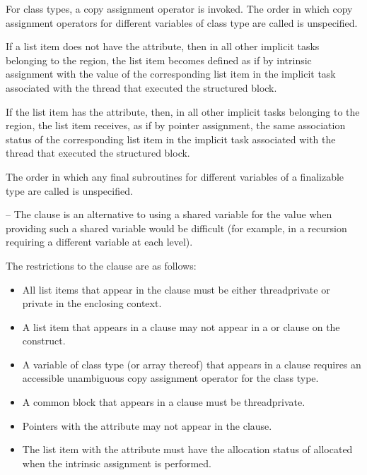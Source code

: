 {{{{\cppspecificstart
For class types, a copy assignment operator is invoked. The order in which copy 
assignment operators for different variables of class type are called is unspecified. 
\cppspecificend

\fortranspecificstart
If a list item does not have the  attribute, then in all other implicit tasks 
belonging to the  region, the list item becomes defined as if by intrinsic 
assignment with the value of the corresponding list item in the implicit task associated 
with the thread that executed the structured block. 

If the list item has the  attribute, then, in all other implicit tasks belonging to 
the  region, the list item receives, as if by pointer assignment, the same 
association status of the corresponding list item in the implicit task associated with the 
thread that executed the structured block.

The order in which any final subroutines for different variables of a finalizable type are called is unspecified.
\fortranspecificend

\notestart
\noteheader – The  clause is an alternative to using a shared variable for the 
value when providing such a shared variable would be difficult (for example, in a 
recursion requiring a different variable at each level). 
\noteend

\restrictions
The restrictions to the  clause are as follows:

\begin{itemize}
\item All list items that appear in the  clause must be either threadprivate 
or private in the enclosing context.

\item A list item that appears in a  clause may not appear in a  or
 clause on the  construct. 

\cppspecificstart
\item A variable of class type (or array thereof) that appears in a  clause 
requires an accessible unambiguous copy assignment operator for the class type.
\cppspecificend

\fortranspecificstart
\item A common block that appears in a  clause must be threadprivate. 

\item Pointers with the  attribute may not appear in the  
clause.
\item The list item with the  attribute must have the allocation status of allocated when the intrinsic assignment is performed. 
\fortranspecificend
\end{itemize}







}}}}
